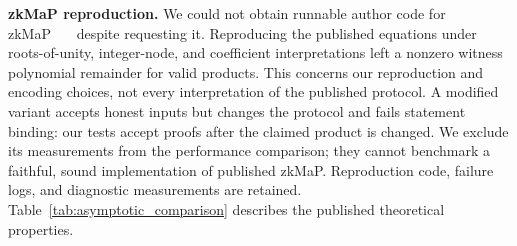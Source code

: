 \documentclass[conference,compsoc]{IEEEtran}
\newif\ifshowrevisions
\newenvironment{revblock}[1][]
  {%
    \ifshowrevisions
      \begin{tcolorbox}[
        breakable,
        colback=revisionyellow,
        colframe=revisionyellow,
        boxrule=0pt,
        arc=0pt,
        left=2pt,
        right=2pt,
        top=2pt,
        bottom=2pt,
        before skip=2pt,
        after skip=2pt,
        #1
      ]
    \fi
  }
  {%
    \ifshowrevisions
      \end{tcolorbox}
    \fi
  }
\theoremstyle{plain}
\theoremstyle{definition}
\theoremstyle{remark}
\providecommand{\DIFaddtex}[1]{{\protect\color{blue}\uwave{#1}}} %
\providecommand{\DIFaddend}{} %
\providecommand{\DIFadd}[1]{\texorpdfstring{\DIFaddtex{#1}}{#1}} %
\renewcommand{\DIFaddtex}[1]{{\protect\color{DiffBlue}#1}}
\begin{document}
\begin{revblock}
\noindent\textbf{\DIFadd{zkMaP reproduction.}}
\DIFadd{We could not obtain runnable author code for zkMaP~\mbox{%
\cite{zkMaP} }\hskip0pt%
despite
requesting it. Reproducing the published equations under roots-of-unity,
integer-node, and coefficient interpretations left a nonzero witness
polynomial remainder for valid products. This concerns our reproduction and
encoding choices, not every interpretation of the published protocol. A
modified variant accepts honest inputs but changes the protocol and fails
statement binding: our tests accept proofs after the claimed product is
changed. We exclude its measurements from the performance comparison; they
cannot benchmark a faithful, sound implementation of published zkMaP.
Reproduction code, failure logs, and diagnostic measurements are retained.
Table~\ref{tab:asymptotic_comparison} describes the published theoretical
properties}\DIFaddend .
\end{revblock}
\end{document}
